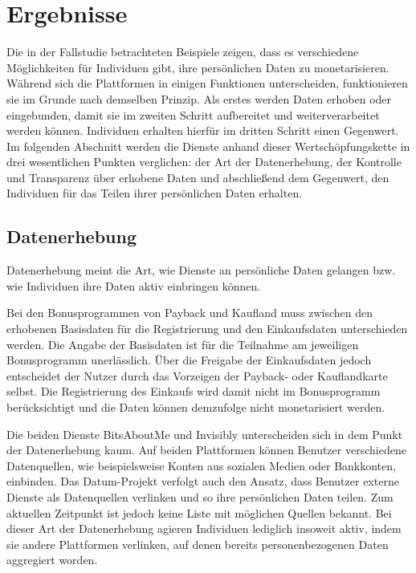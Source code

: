 \section{Ergebnisse}
Die in der Fallstudie betrachteten Beispiele zeigen, dass es verschiedene Möglichkeiten für Individuen gibt, ihre persönlichen Daten zu monetarisieren. Während sich die Plattformen in einigen Funktionen unterscheiden, funktionieren sie im Grunde nach demselben Prinzip. Als erstes werden Daten erhoben oder eingebunden, damit sie im zweiten Schritt aufbereitet und weiterverarbeitet werden können. Individuen erhalten hierfür im dritten Schritt einen Gegenwert. Im folgenden Abschnitt werden die Dienste anhand dieser Wertschöpfungskette in drei wesentlichen Punkten verglichen: der Art der Datenerhebung, der Kontrolle und Transparenz über erhobene Daten und abschließend dem Gegenwert, den Individuen für das Teilen ihrer persönlichen Daten erhalten.

\subsection{Datenerhebung}
Datenerhebung meint die Art, wie Dienste an persönliche Daten gelangen bzw. wie Individuen ihre Daten aktiv einbringen können. \newline

\noindent Bei den Bonusprogrammen von Payback und Kaufland muss zwischen den erhobenen Basisdaten für die Registrierung und den Einkaufsdaten unterschieden werden. Die Angabe der Basisdaten ist für die Teilnahme am jeweiligen Bonusprogramm unerlässlich. Über die Freigabe der Einkaufsdaten jedoch entscheidet der Nutzer durch das Vorzeigen der Payback- oder Kauflandkarte selbst. Die Registrierung des Einkaufs wird damit nicht im Bonusprogramm berücksichtigt und die Daten können demzufolge nicht monetarisiert werden. \newline

\noindent Die beiden Dienste BitsAboutMe und Invisibly unterscheiden sich in dem Punkt der Datenerhebung kaum. Auf beiden Plattformen können Benutzer verschiedene Datenquellen, wie beispielsweise Konten aus sozialen Medien oder Bankkonten, einbinden. Das Datum-Projekt verfolgt auch den Ansatz, dass Benutzer externe Dienste als Datenquellen verlinken und so ihre persönlichen Daten teilen. Zum aktuellen Zeitpunkt ist jedoch keine Liste mit möglichen Quellen bekannt. Bei dieser Art der Datenerhebung agieren Individuen lediglich insoweit aktiv, indem sie andere Plattformen verlinken, auf denen bereits personenbezogenen Daten aggregiert worden. \newline

